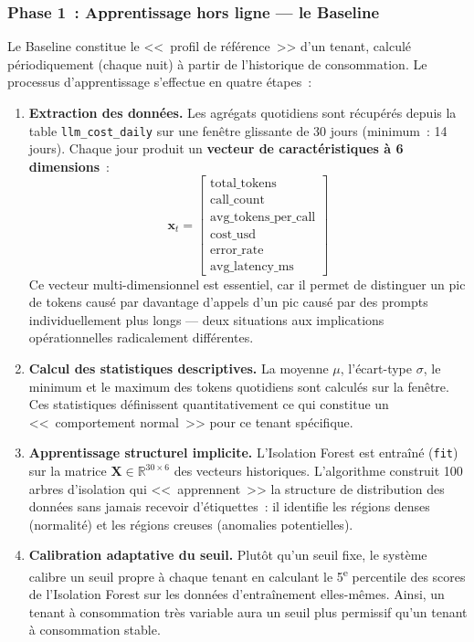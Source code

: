 \subsubsection{Phase 1~: Apprentissage hors ligne --- le Baseline}

Le Baseline constitue le <<~profil de référence~>> d'un tenant, calculé périodiquement (chaque nuit) à partir de l'historique de consommation. Le processus d'apprentissage s'effectue en quatre étapes~:

\begin{enumerate}[noitemsep]
    \item \textbf{Extraction des données.} Les agrégats quotidiens sont récupérés depuis la table \texttt{llm\_cost\_daily} sur une fenêtre glissante de 30 jours (minimum~: 14 jours). Chaque jour produit un \textbf{vecteur de caractéristiques à 6 dimensions}~:
    \begin{equation}
    \mathbf{x}_t = \begin{bmatrix} \text{total\_tokens} \\ \text{call\_count} \\ \text{avg\_tokens\_per\_call} \\ \text{cost\_usd} \\ \text{error\_rate} \\ \text{avg\_latency\_ms} \end{bmatrix}
    \end{equation}
    Ce vecteur multi-dimensionnel est essentiel, car il permet de distinguer un pic de tokens causé par davantage d'appels d'un pic causé par des prompts individuellement plus longs --- deux situations aux implications opérationnelles radicalement différentes.

    \item \textbf{Calcul des statistiques descriptives.} La moyenne $\mu$, l'écart-type $\sigma$, le minimum et le maximum des tokens quotidiens sont calculés sur la fenêtre. Ces statistiques définissent quantitativement ce qui constitue un <<~comportement normal~>> pour ce tenant spécifique.

    \item \textbf{Apprentissage structurel implicite.} L'Isolation Forest est entraîné (\texttt{fit}) sur la matrice $\mathbf{X} \in \mathbb{R}^{30 \times 6}$ des vecteurs historiques. L'algorithme construit 100 arbres d'isolation qui <<~apprennent~>> la structure de distribution des données sans jamais recevoir d'étiquettes~: il identifie les régions denses (normalité) et les régions creuses (anomalies potentielles).

    \item \textbf{Calibration adaptative du seuil.} Plutôt qu'un seuil fixe, le système calibre un seuil propre à chaque tenant en calculant le 5\textsuperscript{e} percentile des scores de l'Isolation Forest sur les données d'entraînement elles-mêmes. Ainsi, un tenant à consommation très variable aura un seuil plus permissif qu'un tenant à consommation stable.
\end{enumerate}

